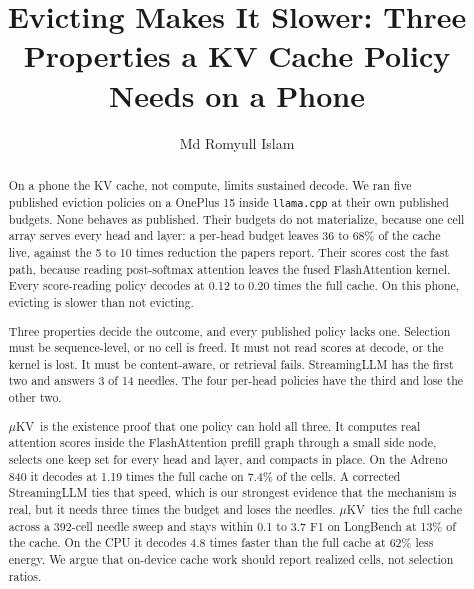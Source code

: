 \documentclass[sigconf, anonymous=false, screen=true, 10pt]{acmart}
\newcommand{\muKV}{$\mu$KV}
\begin{document}
\title[Evicting Makes It Slower]{Evicting Makes It Slower: Three Properties a KV Cache Policy Needs on a Phone}

\author{Md Romyull Islam}

\begin{abstract}
On a phone the KV cache, not compute, limits sustained decode. We ran five published eviction policies on a OnePlus 15 inside \texttt{llama.cpp} at their own published budgets. None behaves as published. Their budgets do not materialize, because one cell array serves every head and layer: a per-head budget leaves 36 to 68\% of the cache live, against the 5 to 10 times reduction the papers report. Their scores cost the fast path, because reading post-softmax attention leaves the fused FlashAttention kernel. Every score-reading policy decodes at 0.12 to 0.20 times the full cache. On this phone, evicting is slower than not evicting.

Three properties decide the outcome, and every published policy lacks one. Selection must be sequence-level, or no cell is freed. It must not read scores at decode, or the kernel is lost. It must be content-aware, or retrieval fails. StreamingLLM has the first two and answers 3 of 14 needles. The four per-head policies have the third and lose the other two.

\muKV\ is the existence proof that one policy can hold all three. It computes real attention scores inside the FlashAttention prefill graph through a small side node, selects one keep set for every head and layer, and compacts in place. On the Adreno 840 it decodes at 1.19 times the full cache on 7.4\% of the cells. A corrected StreamingLLM ties that speed, which is our strongest evidence that the mechanism is real, but it needs three times the budget and loses the needles. \muKV\ ties the full cache across a 392-cell needle sweep and stays within 0.1 to 3.7 F1 on LongBench at 13\% of the cache. On the CPU it decodes 4.8 times faster than the full cache at 62\% less energy. We argue that on-device cache work should report realized cells, not selection ratios.
\end{abstract}


\maketitle
\makeatletter{}\makeatother
\end{document}
